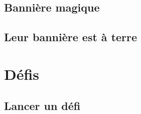 
\subsection{Bannière magique}


\subsection{Leur bannière est à terre}


\section{Défis}

\subsection{Lancer un défi}


